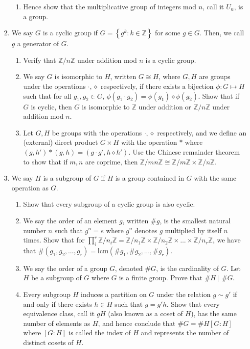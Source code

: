 \documentclass[letterpaper,12pt]{article}
\newcommand{\set}[1]{\left\{ #1 \right\}}
\begin{document}
\begin{enumerate}
\begin{enumerate}
    \item Hence show that the multiplicative group of integers mod $n$, call it $U_n$, is a group.
\end{enumerate}
\item We say $G$ is a cyclic group if $G = \set{g^k : k \in \mathbb{Z}}$ for some $g \in G$. Then, we call $g$ a generator of $G$. \begin{enumerate}
    \item Verify that $\mathbb{Z}/n\mathbb{Z}$ under addition mod $n$ is a cyclic group.
    \item We say $G$ is isomorphic to $H$, written $G\cong H$, where $G,H$ are groups under the operations $\cdot,\diamond$ respectively, if there exists a bijection $\phi: G \mapsto H$ such that for all $g_1,g_2 \in G$, $\phi(g_1\cdot g_2) = \phi(g_1)\diamond \phi(g_2)$. Show that if $G$ is cyclic, then $G$ is isomorphic to $\mathbb{Z}$ under addition or $\mathbb{Z}/n\mathbb{Z}$ under addition mod $n$.
    \item Let $G,H$ be groups with the operations $\cdot,\diamond$ respectively, and we define an (external) direct product $G\times H$ with the operation $*$ where $(g,h')*(g,h) = (g\cdot g',h\diamond h')$. Use the Chinese remainder theorem to show that if $m,n$ are coprime, then $\mathbb{Z}/mn\mathbb{Z}\cong \mathbb{Z}/m\mathbb{Z} \times \mathbb{Z}/n\mathbb{Z}$.
\end{enumerate}
\item We say $H$ is a subgroup of $G$ if $H$ is a group contained in $G$ with the same operation as $G$. \begin{enumerate}
    \item Show that every subgroup of a cyclic group is also cyclic.
    \item We say the order of an element $g$, written $\#g$, is the smallest natural number $n$ such that $g^n = e$ where $g^n$ denotes $g$ multiplied by itself $n$ times. Show that for $\prod_i^r \mathbb{Z}/n_i\mathbb{Z} = \mathbb{Z}/n_1\mathbb{Z}\times \mathbb{Z}/n_2\mathbb{Z}\times \ldots \times \mathbb{Z}/n_r\mathbb{Z}$, we have that $\# (g_1,g_2,\ldots,g_r) = \mathrm{lcm}(\#g_1,\#g_2,\ldots,\#g_r)$.
    \item We say the order of a group $G$, denoted $\# G$, is the cardinality of $G$. Let $H$ be a subgroup of $G$ where $G$ is a finite group. Prove that $\#H \mid \#G$.
    \item Every subgroup $H$ induces a partition on $G$ under the relation $g \sim g'$ if and only if there exists $h \in H$ such that $g = g'h$. Show that every equivalence class, call it $gH$ (also known as a coset of $H$), has the same number of elements as $H$, and hence conclude that $\#G = \#H [G:H]$ where $[G:H]$ is called the index of $H$ and represents the number of distinct cosets of $H$.

\end{enumerate}
\end{enumerate}
\end{document}
